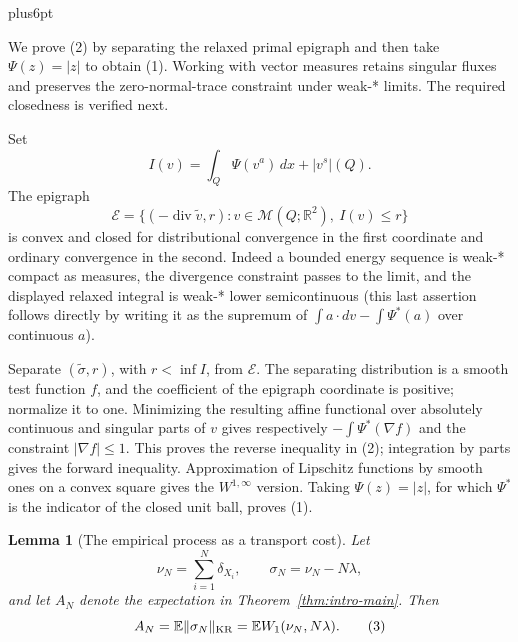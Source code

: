 \documentclass[11pt,reqno]{amsart}
\makeatletter
\theoremstyle{plain}
\newtheorem{lemma}[theorem]{Lemma}
\theoremstyle{definition}
\theoremstyle{remark}
\renewenvironment{proof}[1][\proofname]{%
  \par
  \pushQED{\qed}%
  \normalfont
  \topsep6pt plus6pt\relax
  \trivlist
  \item[\hskip\labelsep\slshape #1\@addpunct{.}]%
  \ignorespaces
}{%
  \popQED
  \endtrivlist
  \@endpefalse
}
\DeclareRobustCommand{\qed}{%
  \leavevmode\unskip\penalty9999\hbox{}\nobreak
  \ifmmode
    \makebox[0pt][l]{\qquad\hbox{\qedsymbol}}%
  \else
    \qquad\hbox{\qedsymbol}%
  \fi
}
\renewcommand{\qedsymbol}{\rule[.47pt]{4pt}{6pt}}
\numberwithin{equation}{section}
\newcommand{\1}{\mathbf 1}
\makeatother
\begin{document}
\begin{proof}
We prove (2) by separating the relaxed primal epigraph and then take
$\Psi(z)=|z|$ to obtain (1).  Working with vector measures retains
singular fluxes and preserves the zero-normal-trace constraint under
weak-* limits.  The required closedness is verified next.

Set
\begin{equation*}
I(v)=\int_ Q\Psi(v^a)\,dx+|v^s|(Q).
\end{equation*}
The epigraph
\begin{equation*}
\mathscr E=\{(-\operatorname {div}\widetilde v,r):
v\in\mathcal M(Q;\mathbb R^2),\ I(v)\leq r\}
\end{equation*}
is convex and closed for distributional convergence in the first
coordinate and ordinary convergence in the second.  Indeed a bounded
energy sequence is weak-* compact as measures, the divergence constraint
passes to the limit, and the displayed relaxed integral is weak-* lower
semicontinuous (this last assertion follows directly by writing it as
the supremum of $\int a\cdot dv-\int\Psi^*(a)$ over continuous
$a$).

Separate $(\widetilde\sigma,r)$, with $r<\inf I$, from
$\mathscr E$.  The separating distribution is a smooth test function
$f$, and the coefficient of the epigraph coordinate is positive;
normalize it to one.  Minimizing the resulting affine functional over
absolutely continuous and singular parts of $v$ gives respectively
$-\int\Psi^*(\nabla f)$ and the constraint $|\nabla f|\leq1$.
This proves the reverse inequality in (2); integration by parts gives
the forward inequality.  Approximation of Lipschitz functions by smooth
ones on a convex square gives the $W^{1,\infty}$ version.  Taking
$\Psi(z)=|z|$, for which $\Psi^*$ is the indicator of the closed unit
ball, proves (1).
\end{proof}

\begin{lemma}[The empirical process as a transport cost]\label{lem:empirical-transport}
Let
\begin{equation*}
\nu_ N=\sum_ {i=1}^N\delta_ {X_ i},\qquad \sigma_ N=\nu_ N-N\lambda,
\end{equation*}
and let $A_ N$ denote the expectation in Theorem~\ref{thm:intro-main}. Then
\begin{equation}
A_ N=\mathbb E\|\sigma_ N\|_ {\rm KR}
=\mathbb E W_ 1(\nu_ N,N\lambda).
\tag{3}
\end{equation}

\end{lemma}
\end{document}
